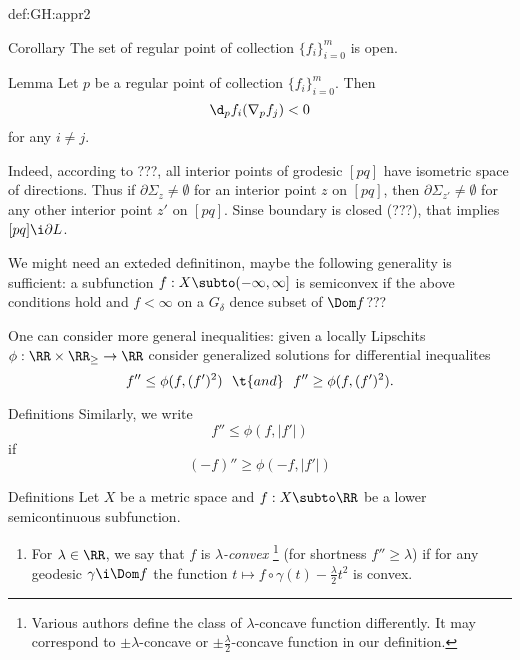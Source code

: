 {\begin{subthm}{def:GH:appr2}
\begin{thm}{Corollary}
The set of regular point of collection $\{f_i\}_{i=0}^m$ is open.
\end{thm}

\begin{thm}{Lemma}
Let $p$ be a regular point of collection $\{f_i\}_{i=0}^m$.
Then 
$$\d_pf_i(\nabla_pf_j)<0$$ 
for any $i\not=j$.
\end{thm}









Indeed, according to ???, all interior points of grodesic $[pq]$ have isometric space of directions.
Thus if $\partial\Sigma_z\not=\emptyset$ for an interior point $z$ on $[pq]$, 
then $\partial\Sigma_{z'}\not=\emptyset$ for any other interior point $z'$ on $[pq]$.
Sinse boundary is closed (???), that implies $[pq]\i \partial L$. 















{\small {}
We might need an exteded definitinon, maybe the following generality is sufficient: a subfunction $f:X\subto(-\infty,\infty]$ 
is semiconvex if the above conditions hold and $f<\infty$ on a $G_\delta$ dence subset of $\Dom f$???
\medskip

One can consider more general inequalities:
given a locally Lipschits $\phi:\RR\times\RR_\ge\to\RR$ consider generalized solutions for differential inequalites 
$$f''\le \phi(f,(f')^2)\ \ \t{and}\ \ f''\ge \phi(f,(f')^2).$$}



\begin{thm}{Definitions}
Similarly, we write $$f''\le \phi(f,|f'|)$$
if $$(-f)''\ge \phi(-f,|f'|)$$
\end{thm}

\begin{thm}{Definitions}
\label{def:concave}
Let $X$ be a metric space and $f:X\subto\RR$ be a lower semicontinuous subfunction.
\begin{enumerate}[(1)]
\item For $\lambda\in\RR$, we say that $f$ is \emph{$\lambda$-convex}%
\footnote{Various authors define the class of $\lambda$-concave function differently. It may correspond to $\pm\lambda$-concave or $\pm\tfrac\lambda2$-concave function in our definition.}%
(for shortness $f''\ge \lambda$) 
if for any geodesic $\gamma\i \Dom f$ the function 
$t\mapsto f\circ\gamma(t)-\tfrac\lambda2 t^2$
is convex.


\end{enumerate}
\end{thm}
\end{subthm}}
